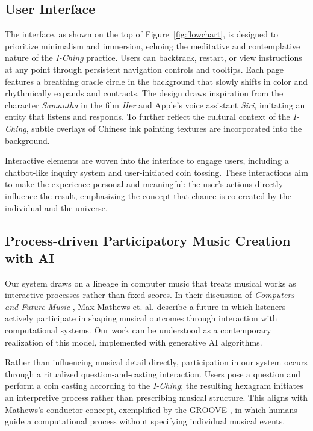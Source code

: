 \documentclass{article}
\begin{document}
\subsection{User Interface}\label{subsec:userInterface}
The interface, as shown on the top of Figure~\ref{fig:flowchart}, is designed to prioritize minimalism and immersion, echoing the meditative and contemplative nature of the \textit{I-Ching} practice.
Users can backtrack, restart, or view instructions at any point through persistent navigation controls and tooltips. 
Each page features a breathing oracle circle in the background that slowly shifts in color and rhythmically expands and contracts.
The design draws inspiration from the character \textit{Samantha} in the film \textit{Her} and Apple's voice assistant \textit{Siri}, imitating an entity that listens and responds. 
To further reflect the cultural context of the \textit{I-Ching}, subtle overlays of Chinese ink painting textures are incorporated into the background.

Interactive elements are woven into the interface to engage users, including a chatbot-like inquiry system and user-initiated coin tossing. 
These interactions aim to make the experience personal and meaningful: the user's actions directly influence the result, emphasizing the concept that chance is co-created by the individual and the universe. 

\subsection{Process-driven Participatory Music Creation with AI}
Our system draws on a lineage in computer music that treats musical works as interactive processes rather than fixed scores. In their discussion of \textit{Computers and Future Music} \cite{maxmatthews}, Max Mathews et. al. describe a future in which listeners actively participate in shaping musical outcomes through interaction with computational systems. Our work can be understood as a contemporary realization of this model, implemented with generative AI algorithms.

Rather than influencing musical detail directly, participation in our system occurs through a ritualized question-and-casting interaction. Users pose a question and perform a coin casting according to the \textit{I-Ching}; the resulting hexagram initiates an interpretive process rather than prescribing musical structure. This aligns with Mathews’s conductor concept, exemplified by the GROOVE \cite{maxmatthews}, in which humans guide a computational process without specifying individual musical events.
\end{document}
